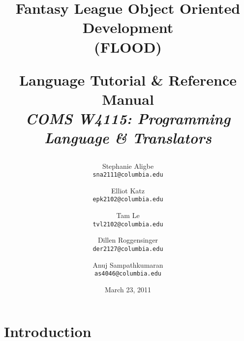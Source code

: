 \documentclass[12pt]{report}
\begin{document}
\title{
\begin{doublespace}
\begin{singlespace}
\textbf{Fantasy League Object Oriented Development}\\
\textbf{(FLOOD)}\\
\end{singlespace}
\LARGE{Language Tutorial \& Reference Manual}\\
{\normalsize \textit{COMS W4115: Programming Language \& Translators}}\\
\end{doublespace}
}

\author{
  Stephanie Aligbe\\
  \texttt{\small{sna2111@columbia.edu}}
  \and
  Elliot Katz\\
  \texttt{\small{epk2102@columbia.edu}}
  \and
  Tam Le\\
  \texttt{\small{tvl2102@columbia.edu}}
  \and
  Dillen Roggensinger\\
  \texttt{\small{der2127@columbia.edu}}
  \and
  Anuj Sampathkumaran\\
  \texttt{\small{as4046@columbia.edu}}
}

\date{March 23, 2011}

\maketitle

\tableofcontents

\chapter{Introduction}
\end{document}
